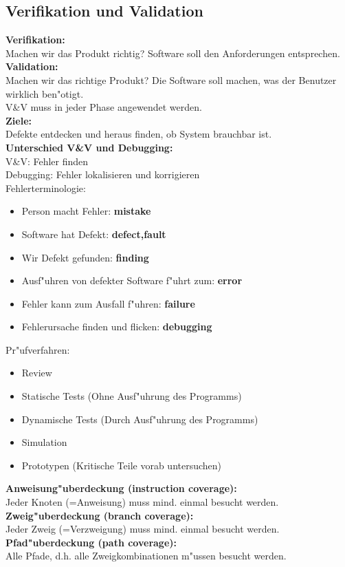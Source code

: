 \subsection{Verifikation und Validation}
\textbf{Verifikation:}\\
Machen wir das Produkt richtig? Software soll den Anforderungen entsprechen.\\
\textbf{Validation:}\\
Machen wir das richtige Produkt? Die Software soll machen, was der Benutzer wirklich ben"otigt.\\
V\&V muss in jeder Phase angewendet werden.\\
\textbf{Ziele:}\\
Defekte entdecken und heraus finden, ob System brauchbar ist.\\
\textbf{Unterschied V\&V und Debugging:}\\
V\&V: Fehler finden\\ 
Debugging: Fehler lokalisieren und korrigieren\\
Fehlerterminologie:
\begin{itemize}
\item Person macht Fehler: \textbf{mistake}
\item Software hat Defekt: \textbf{defect,fault}
\item Wir Defekt gefunden: \textbf{finding}
\item Ausf"uhren von defekter Software f"uhrt zum: \textbf{error}
\item Fehler kann zum Ausfall f"uhren: \textbf{failure}
\item Fehlerursache finden und flicken: \textbf{debugging}
\end{itemize}
Pr"ufverfahren:
\begin{itemize}
\item Review
\item Statische Tests (Ohne Ausf"uhrung des Programms)
\item Dynamische Tests (Durch Ausf"uhrung des Programms)
\item Simulation
\item Prototypen (Kritische Teile vorab untersuchen)
\end{itemize}

\textbf{Anweisung"uberdeckung (instruction coverage):}\\
Jeder Knoten (=Anweisung) muss mind. einmal besucht werden. \\
\textbf{Zweig"uberdeckung (branch coverage):}\\
Jeder Zweig (=Verzweigung) muss mind. einmal besucht werden. \\
\textbf{Pfad"uberdeckung (path coverage):}\\
Alle Pfade, d.h. alle Zweigkombinationen m"ussen besucht werden. \\


